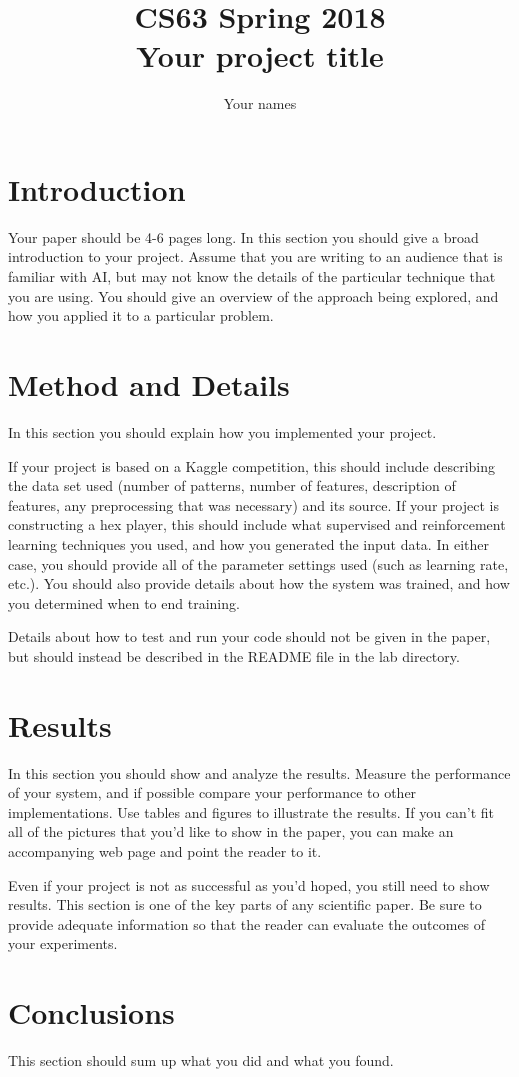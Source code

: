 \documentclass[11pt]{article}
\title{CS63 Spring 2018\\Your project title}
\author{Your names}
\date{}
\begin{document}
\maketitle

\section{Introduction}

Your paper should be 4-6 pages long.  In this section you should give
a broad introduction to your project.  Assume that you are writing to
an audience that is familiar with AI, but may not know the details of
the particular technique that you are using.  You should give an
overview of the approach being explored, and how you applied it to a
particular problem.

\section{Method and Details}

In this section you should explain how you implemented your project.

If your project is based on a Kaggle competition, this should include
describing the data set used (number of patterns, number of features,
description of features, any preprocessing that was necessary) and its
source.
If your project is constructing a hex player, this should include what
supervised and reinforcement learning techniques you used, and how you
generated the input data.
In either case, you should provide all of the parameter settings used (such
as learning rate, etc.).  You should also provide details about how
the system was trained, and how you determined when to end training.

Details about how to test and run your code should not be given in the
paper, but should instead be described in the README file in the lab
directory. 

\section{Results}

In this section you should show and analyze the results.  Measure the
performance of your system, and if possible compare your performance
to other implementations. Use tables and figures to illustrate the
results.  If you can't fit all of the pictures that you'd like to show
in the paper, you can make an accompanying web page and point the
reader to it.

Even if your project is not as successful as you'd hoped, you still
need to show results.  This section is one of the key parts of any
scientific paper.  Be sure to provide adequate information so that the
reader can evaluate the outcomes of your experiments. 

\section{Conclusions}

This section should sum up what you did and what you found. 
\end{document}
